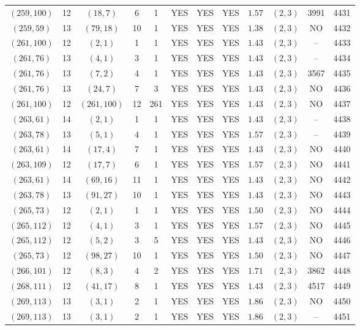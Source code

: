 \begin{longtable}{|c|c|c|c|c|c|c|c|c|c|c|c|}
$(259,100)$ & 12 & $(18,7)$ & 6 & 1 & YES & YES & YES & $1.57$ & $(2,3)$ & 3991 & 4431\\
$(259,59)$ & 13 & $(79,18)$ & 10 & 1 & YES & YES & YES & $1.38$ & $(2,3)$ & NO & 4432\\
$(261,100)$ & 12 & $(2,1)$ & 1 & 1 & YES & YES & YES & $1.43$ & $(2,3)$ & -- & 4433\\
$(261,76)$ & 13 & $(4,1)$ & 3 & 1 & YES & YES & YES & $1.43$ & $(2,3)$ & -- & 4434\\
$(261,76)$ & 13 & $(7,2)$ & 4 & 1 & YES & YES & YES & $1.43$ & $(2,3)$ & 3567 & 4435\\
$(261,76)$ & 13 & $(24,7)$ & 7 & 3 & YES & YES & YES & $1.43$ & $(2,3)$ & NO & 4436\\
$(261,100)$ & 12 & $(261,100)$ & 12 & 261 & YES & YES & YES & $1.43$ & $(2,3)$ & NO & 4437\\
$(263,61)$ & 14 & $(2,1)$ & 1 & 1 & YES & YES & YES & $1.43$ & $(2,3)$ & -- & 4438\\
$(263,78)$ & 13 & $(5,1)$ & 4 & 1 & YES & YES & YES & $1.57$ & $(2,3)$ & -- & 4439\\
$(263,61)$ & 14 & $(17,4)$ & 7 & 1 & YES & YES & YES & $1.43$ & $(2,3)$ & NO & 4440\\
$(263,109)$ & 12 & $(17,7)$ & 6 & 1 & YES & YES & YES & $1.57$ & $(2,3)$ & NO & 4441\\
$(263,61)$ & 14 & $(69,16)$ & 11 & 1 & YES & YES & YES & $1.43$ & $(2,3)$ & NO & 4442\\
$(263,78)$ & 13 & $(91,27)$ & 10 & 1 & YES & YES & YES & $1.43$ & $(2,3)$ & NO & 4443\\
$(265,73)$ & 12 & $(2,1)$ & 1 & 1 & YES & YES & YES & $1.50$ & $(2,3)$ & NO & 4444\\
$(265,112)$ & 12 & $(4,1)$ & 3 & 1 & YES & YES & YES & $1.57$ & $(2,3)$ & NO & 4445\\
$(265,112)$ & 12 & $(5,2)$ & 3 & 5 & YES & YES & YES & $1.43$ & $(2,3)$ & NO & 4446\\
$(265,73)$ & 12 & $(98,27)$ & 10 & 1 & YES & YES & YES & $1.50$ & $(2,3)$ & NO & 4447\\
$(266,101)$ & 12 & $(8,3)$ & 4 & 2 & YES & YES & YES & $1.71$ & $(2,3)$ & 3862 & 4448\\
$(268,111)$ & 12 & $(41,17)$ & 8 & 1 & YES & YES & YES & $1.43$ & $(2,3)$ & 4517 & 4449\\
$(269,113)$ & 13 & $(3,1)$ & 2 & 1 & YES & YES & YES & $1.86$ & $(2,3)$ & NO & 4450\\
$(269,113)$ & 13 & $(3,1)$ & 2 & 1 & YES & YES & YES & $1.86$ & $(2,3)$ & -- & 4451\\

\end{longtable}
